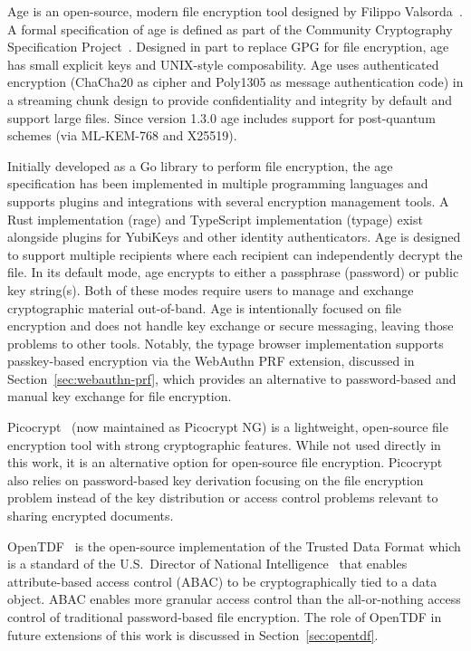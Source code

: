 Age is an open-source, modern file encryption tool designed by Filippo Valsorda~\cite{age_repo}. A formal specification of age is defined as part of the Community Cryptography Specification Project~\cite{age_spec}. Designed in part to replace GPG for file encryption, age has small explicit keys and UNIX-style composability. Age uses authenticated encryption (ChaCha20 as cipher and Poly1305 as message authentication code) in a streaming chunk design to provide confidentiality and integrity by default and support large files. Since version 1.3.0 age includes support for post-quantum schemes (via ML-KEM-768 and X25519).

Initially developed as a Go library to perform file encryption, the age specification has been implemented in multiple programming languages and supports plugins and integrations with several encryption management tools. A Rust implementation (rage) and TypeScript implementation (typage) exist alongside plugins for YubiKey\textregistered{}s and other identity authenticators. Age is designed to support multiple recipients where each recipient can independently decrypt the file. In its default mode, age encrypts to either a passphrase (password) or public key string(s). Both of these modes require users to manage and exchange cryptographic material out-of-band. Age is intentionally focused on file encryption and does not handle key exchange or secure messaging, leaving those problems to other tools. Notably, the typage browser implementation supports passkey-based encryption via the WebAuthn PRF extension, discussed in Section~\ref{sec:webauthn-prf}, which provides an alternative to password-based and manual key exchange for file encryption.

Picocrypt~\cite{picocrypt_repo} (now maintained as Picocrypt NG) is a lightweight, open-source file encryption tool with strong cryptographic features. While not used directly in this work, it is an alternative option for open-source file encryption. Picocrypt also relies on password-based key derivation focusing on the file encryption problem instead of the key distribution or access control problems relevant to sharing encrypted documents.

OpenTDF~\cite{opentdf_spec} is the open-source implementation of the Trusted Data Format which is a standard of the U.S.\ Director of National Intelligence~\cite{dni_tdf} that enables attribute-based access control (ABAC) to be cryptographically tied to a data object. ABAC enables more granular access control than the all-or-nothing access control of traditional password-based file encryption. The role of OpenTDF in future extensions of this work is discussed in Section~\ref{sec:opentdf}.

